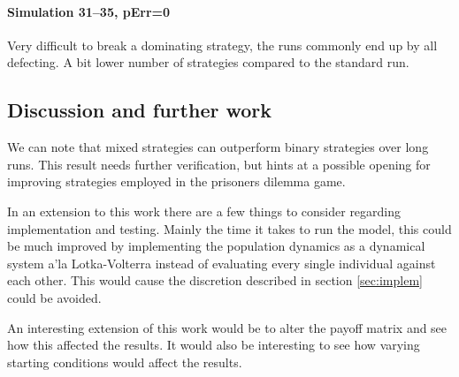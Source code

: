 \paragraph{Simulation 31--35, pErr=0}
Very difficult to break a dominating strategy, the runs commonly end up by all defecting. A bit lower number of strategies compared to the standard run. 


\subsection{Discussion and further work}
We can note that mixed strategies can outperform binary strategies over long runs. This result needs further verification, but hints at a possible opening for improving strategies employed in the prisoners dilemma game.

In an extension to this work there are a few things to consider regarding implementation and testing. Mainly the time it takes to run the model, this could be much improved by implementing the population dynamics as a dynamical system a'la Lotka-Volterra instead of evaluating every single individual against each other. This would cause the discretion described in section \ref{sec:implem} could be avoided.

An interesting extension of this work would be to alter the payoff matrix and see how this affected the results. It would also be interesting to see how varying starting conditions would affect the results.






